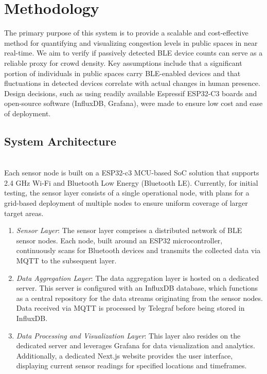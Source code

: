 \documentclass[runningheads]{llncs}
\begin{document}
\section{Methodology}
The primary purpose of this system is to provide a scalable and cost-effective method for quantifying and visualizing congestion levels in public spaces in near real-time. We aim to verify if passively detected BLE device counts can serve as a reliable proxy for crowd density. Key assumptions include that a significant portion of individuals in public spaces carry BLE-enabled devices and that fluctuations in detected devices correlate with actual changes in human presence. Design decisions, such as using readily available Espressif ESP32-C3 boards and open-source software (InfluxDB, Grafana), were made to ensure low cost and ease of deployment.
\subsection{System Architecture}

\\
Each sensor node is built on a ESP32-c3 MCU-based SoC solution that supports 2.4 GHz Wi-Fi and Bluetooth Low Energy (Bluetooth LE)\cite{Espressif_Datasheet}. Currently, for initial testing, the sensor layer consists of a single operational node, with plans for a grid-based deployment of multiple nodes to ensure uniform coverage of larger target areas.
\begin{enumerate}
\item \emph{Sensor Layer}: The sensor layer comprises a distributed network of BLE sensor nodes. Each node, built around an ESP32 microcontroller, continuously scans for Bluetooth devices and transmits the collected data via MQTT to the subsequent layer.
\item \emph{Data Aggregation Layer}: The data aggregation layer is hosted on a dedicated server. This server is configured with an InfluxDB database, which functions as a central repository for the data streams originating from the sensor nodes. Data received via MQTT is processed by Telegraf before being stored in InfluxDB.
\item \emph{Data Processing and Visualization Layer}: This layer also resides on the dedicated server and leverages Grafana for data visualization and analytics. Additionally, a dedicated Next.js website provides the user interface, displaying current sensor readings for specified locations and timeframes.
\end{enumerate}
\end{document}
